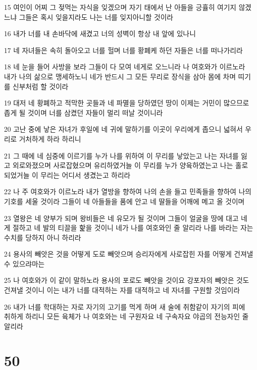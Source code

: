 \par 15 여인이 어찌 그 젖먹는 자식을 잊겠으며 자기 태에서 난 아들을 긍휼히 여기지 않겠느냐 그들은 혹시 잊을지라도 나는 너를 잊지아니할 것이라
\par 16 내가 너를 내 손바닥에 새겼고 너의 성벽이 항상 내 앞에 있나니
\par 17 네 자녀들은 속히 돌아오고 너를 헐며 너를 황폐케 하던 자들은 너를 떠나가리라
\par 18 네 눈을 들어 사방을 보라 그들이 다 모여 네게로 오느니라 나 여호와가 이르노라 내가 나의 삶으로 맹세하노니 네가 반드시 그 모든 무리로 장식을 삼아 몸에 차며 띠기를 신부처럼 할 것이라
\par 19 대저 네 황폐하고 적막한 곳들과 네 파멸을 당하였던 땅이 이제는 거민이 많으므로 좁게 될 것이며 너를 삼켰던 자들이 멀리 떠날 것이니라
\par 20 고난 중에 낳은 자녀가 후일에 네 귀에 말하기를 이곳이 우리에게 좁으니 넓혀서 우리로 거처하게 하라 하리니
\par 21 그 때에 네 심중에 이르기를 누가 나를 위하여 이 무리를 낳았는고 나는 자녀를 잃고 외로와졌으며 사로잡혔으며 유리하였거늘 이 무리를 누가 양육하였는고 나는 홀로 되었거늘 이 무리는 어디서 생겼는고 하리라
\par 22 나 주 여호와가 이르노라 내가 열방을 향하여 나의 손을 들고 민족들을 향하여 나의 기호를 세울 것이라 그들이 네 아들들을 품에 안고 네 딸들을 어깨에 메고 올 것이며
\par 23 열왕은 네 양부가 되며 왕비들은 네 유모가 될 것이며 그들이 얼굴을 땅에 대고 네게 절하고 네 발의 티끌을 핥을 것이니 네가 나를 여호와인 줄 알리라 나를 바라는 자는 수치를 당하지 아니 하리라
\par 24 용사의 빼앗은 것을 어떻게 도로 빼앗으며 승리자에게 사로잡힌 자를 어떻게 건져낼 수 있으랴마는
\par 25 나 여호와가 이 같이 말하노라 용사의 포로도 빼앗을 것이요 강포자의 빼앗은 것도 건져낼 것이니 이는 내가 너를 대적하는 자를 대적하고 네 자녀를 구원할 것임이라
\par 26 내가 너를 학대하는 자로 자기의 고기를 먹게 하며 새 술에 취함같이 자기의 피에 취하게 하리니 모든 육체가 나 여호와는 네 구원자요 네 구속자요 야곱의 전능자인 줄 알리라

\chapter{50}

